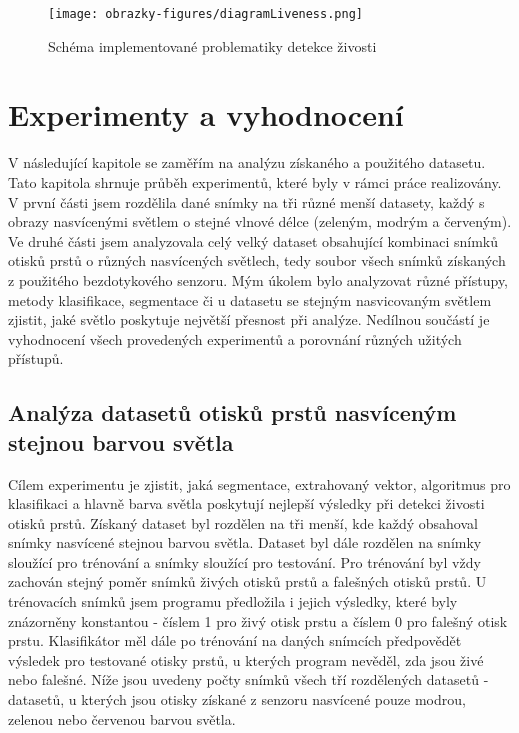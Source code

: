 \begin{figure}[!htbp]
    \centering
    \texttt{[image: obrazky-figures/diagramLiveness.png]}
    \caption{Schéma implementované problematiky detekce živosti}
\end{figure}


\chapter{Experimenty a vyhodnocení}
V následující kapitole se zaměřím na analýzu získaného a použitého datasetu. Tato kapitola shrnuje průběh experimentů, které byly v rámci práce realizovány. V první části jsem rozdělila dané snímky na tři různé menší datasety, každý s obrazy nasvícenými světlem o stejné vlnové délce (zeleným, modrým a červeným). Ve druhé části jsem analyzovala celý velký dataset obsahující kombinaci snímků otisků prstů o různých nasvícených světlech, tedy soubor všech snímků získaných z použitého bezdotykového senzoru. Mým úkolem bylo analyzovat různé přístupy, metody klasifikace, segmentace či u datasetu se stejným nasvicovaným světlem zjistit, jaké světlo poskytuje největší přesnost při analýze. Nedílnou součástí je vyhodnocení všech provedených experimentů a porovnání různých užitých přístupů. 

\section{Analýza datasetů otisků prstů nasvíceným stejnou barvou světla}
Cílem experimentu je zjistit, jaká segmentace, extrahovaný vektor, algoritmus pro klasifikaci a hlavně barva světla poskytují nejlepší výsledky při detekci živosti otisků prstů. Získaný dataset byl rozdělen na tři menší, kde každý obsahoval snímky nasvícené stejnou barvou světla. Dataset byl dále rozdělen na snímky sloužící pro trénování a snímky sloužící pro testování. Pro trénování byl vždy zachován stejný poměr snímků živých otisků prstů a falešných otisků prstů. U trénovacích snímků jsem programu předložila i jejich výsledky, které byly znázorněny konstantou - číslem 1 pro živý otisk prstu a číslem 0 pro falešný otisk prstu. Klasifikátor měl dále po trénování na daných snímcích předpovědět výsledek pro testované otisky prstů, u kterých program nevěděl, zda jsou živé nebo falešné. Níže jsou uvedeny počty snímků všech tří rozdělených datasetů - datasetů, u kterých jsou otisky získané z senzoru nasvícené pouze modrou, zelenou nebo červenou barvou světla. \\\\\

